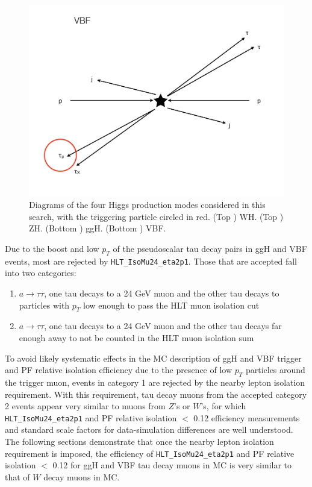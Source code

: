 \begin{figure}[hbtp]
\begin{center}
    \includegraphics[width=\cmsFigWidth]{figures/VBF_trigger}
    \caption{Diagrams of the four Higgs production modes considered in this search, with the triggering particle circled in red.  (Top \cmsLeft) WH.  (Top \cmsRight) ZH.  (Bottom \cmsLeft) ggH.  (Bottom \cmsRight) VBF.}
    \label{fig:WHZH-vs-ggHVBF-trigger}
  \end{center}
\end{figure}

Due to the boost and low $p_T$ of the pseudoscalar tau decay pairs in ggH and VBF events, most are rejected by \texttt{HLT\_IsoMu24\_eta2p1}.  Those that are accepted fall into two categories:

\begin{enumerate}
\item $a\rightarrow\tau\tau$, one tau decays to a 24 GeV muon and the other tau decays to particles with $p_T$ low enough to pass the HLT muon isolation cut
\item $a\rightarrow\tau\tau$, one tau decays to a 24 GeV muon and the other tau decays far enough away to not be counted in the HLT muon isolation sum
\end{enumerate}

To avoid likely systematic effects in the MC description of ggH and VBF trigger and PF relative isolation efficiency due to the presence of low $p_T$ particles around the trigger muon, events in category 1 are rejected by the nearby lepton isolation requirement.  With this requirement, tau decay muons from the accepted category 2 events appear very similar to muons from $Z$'s or $W$'s, for which \texttt{HLT\_IsoMu24\_eta2p1} and PF relative isolation $<$ 0.12 efficiency measurements and standard scale factors for data-simulation differences are well understood. The following sections demonstrate that once the nearby lepton isolation requirement is imposed, the efficiency of \texttt{HLT\_IsoMu24\_eta2p1} and PF relative isolation $<$ 0.12 for ggH and VBF tau decay muons in MC is very similar to that of $W$ decay muons in MC.

